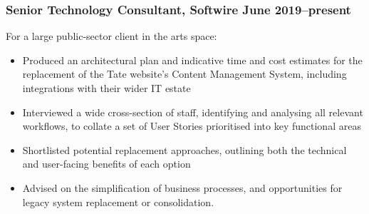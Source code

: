 \documentclass[a4paper, oneside, final, 11pt]{scrartcl} %
\begin{document}
\subsubsection*{Senior Technology Consultant, Softwire \hfill June 2019--present}  
\normalfont
For a large public-sector client in the arts space:
\begin{itemize}
	\item Produced an architectural plan and indicative time and cost estimates for the replacement of the Tate website's Content Management System, including integrations with their wider IT estate
	\item Interviewed a wide cross-section of staff, identifying and analysing all relevant workflows, to collate a set of User Stories prioritised into key functional areas
	\item Shortlisted potential replacement approaches, outlining both the technical and user-facing benefits of each option
	\item Advised on the simplification of business processes, and opportunities for legacy system replacement or consolidation. \\
\end{itemize}

\smallskip 
\end{document}
